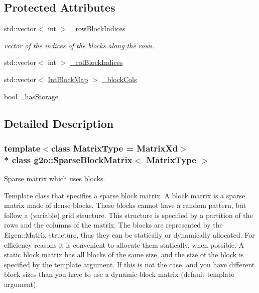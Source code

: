 \subsection*{Protected Attributes}
\begin{DoxyCompactItemize}
\item 
std\+::vector$<$ int $>$ \hyperlink{classg2o_1_1SparseBlockMatrix_ab0bd9c6d5b7b8704af1bc679032382e3}{\+\_\+row\+Block\+Indices}
\begin{DoxyCompactList}\small\item\em vector of the indices of the blocks along the rows. \end{DoxyCompactList}\item 
std\+::vector$<$ int $>$ \hyperlink{classg2o_1_1SparseBlockMatrix_aca008740c37d2d00b90f696ab19abb59}{\+\_\+col\+Block\+Indices}
\item 
std\+::vector$<$ \hyperlink{classg2o_1_1SparseBlockMatrix_aaa6ca1ae454ed70f62992b6401645f4e}{Int\+Block\+Map} $>$ \hyperlink{classg2o_1_1SparseBlockMatrix_ae236d56a01ba4d292450a518621b41f8}{\+\_\+block\+Cols}
\item 
bool \hyperlink{classg2o_1_1SparseBlockMatrix_ae3f063a5efc2708b41806ac361fd3ca6}{\+\_\+has\+Storage}
\end{DoxyCompactItemize}


\subsection{Detailed Description}
\subsubsection*{template$<$class Matrix\+Type = Matrix\+Xd$>$\\*
class g2o\+::\+Sparse\+Block\+Matrix$<$ Matrix\+Type $>$}

Sparse matrix which uses blocks. 

Template class that specifies a sparse block matrix. A block matrix is a sparse matrix made of dense blocks. These blocks cannot have a random pattern, but follow a (variable) grid structure. This structure is specified by a partition of the rows and the columns of the matrix. The blocks are represented by the Eigen\+::\+Matrix structure, thus they can be statically or dynamically allocated. For efficiency reasons it is convenient to allocate them statically, when possible. A static block matrix has all blocks of the same size, and the size of the block is specified by the template argument. If this is not the case, and you have different block sizes than you have to use a dynamic-\/block matrix (default template argument). 

